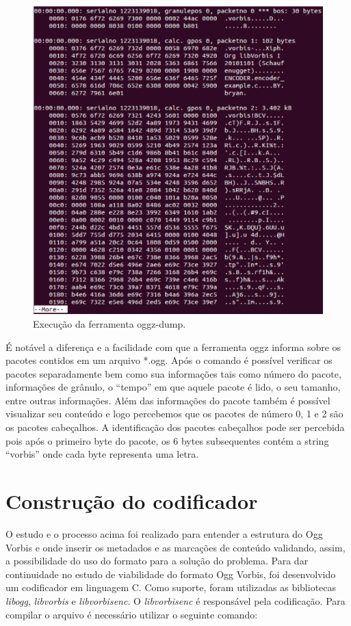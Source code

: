  \begin{figure}[ht]
	\centering
		\includegraphics[keepaspectratio=true,scale=0.5]{figuras/oggz-dump.eps}
	\caption{Execução da ferramenta oggz-dump.}
	\label{oggzdump}
\end{figure}

É notável a diferença e a facilidade com que a ferramenta oggz informa sobre os pacotes contidos em um arquivo *.ogg. Após o comando é possível verificar os pacotes separadamente bem como sua informações tais como número do pacote, informações de grânulo, o ``tempo'' em que aquele pacote é lido, o seu tamanho, entre outras informações. Além das informações do pacote também é possível visualizar seu conteúdo e logo percebemos que os pacotes de número 0, 1 e 2 são os pacotes cabeçalhos. A identificação dos pacotes cabeçalhos pode ser percebida pois após o primeiro byte do pacote, os 6 bytes subsequentes contém a string ``vorbis'' onde cada byte representa uma letra.

\section{Construção do codificador}

O estudo e o processo acima foi realizado para entender a estrutura do Ogg Vorbis e onde inserir os metadados e as marcações de conteúdo validando, assim, a possibilidade do uso do formato para a solução do problema. Para dar continuidade no estudo de viabilidade do formato Ogg Vorbis, foi desenvolvido um codificador em linguagem C. Como suporte, foram utilizadas as bibliotecas \textit{libogg}, \textit{libvorbis} e \textit{libvorbisenc}. O \textit{libvorbisenc} é responsável pela codificação. Para compilar o arquivo é necessário utilizar o seguinte comando: 
	
